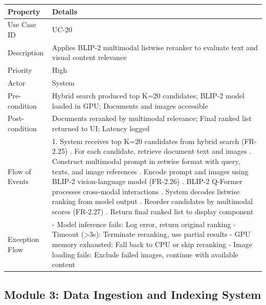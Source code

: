 \begin{table}[H]
\small
\begin{tabularx}{\textwidth}{|p{}|X|}
\hline
\textbf{Property} & \textbf{Details} \\
\hline
Use Case ID & UC-20 \\
\hline
Description & Applies BLIP-2 multimodal listwise reranker to evaluate text and visual content relevance \\
\hline
Priority & High \\
\hline
Actor & System \\
\hline
Pre-condition & Hybrid search produced top K=20 candidates; BLIP-2 model loaded in GPU; Documents and images accessible \\
\hline
Post-condition & Documents reranked by multimodal relevance; Final ranked list returned to UI; Latency logged \\
\hline
Flow of Events & 1. System receives top K=20 candidates from hybrid search (FR-2.25) \newline 2. For each candidate, retrieve document text and images \newline 3. Construct multimodal prompt in setwise format with query, texts, and image references \newline 4. Encode prompt and images using BLIP-2 vision-language model (FR-2.26) \newline 5. BLIP-2 Q-Former processes cross-modal interactions \newline 6. System decodes listwise ranking from model output \newline 7. Reorder candidates by multimodal scores (FR-2.27) \newline 8. Return final ranked list to display component \\
\hline
Exception Flow & - Model inference fails: Log error, return original ranking \newline - Timeout (>3s): Terminate reranking, use partial results \newline - GPU memory exhausted: Fall back to CPU or skip reranking \newline - Image loading fails: Exclude failed images, continue with available content \\
\hline
\end{tabularx}
\end{table}

\subsection*{Module 3: Data Ingestion and Indexing System}

